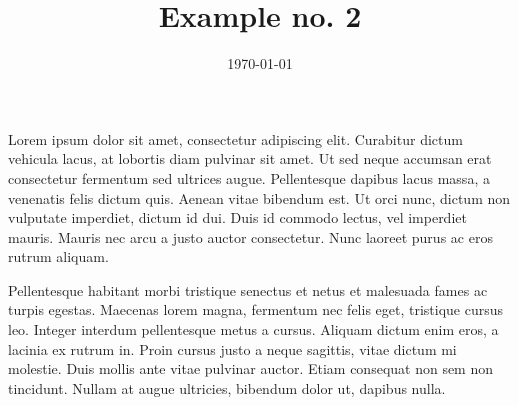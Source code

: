 
\title{Example no. 2}
\date{\today}


\maketitle
Lorem ipsum dolor sit amet, consectetur adipiscing elit. Curabitur dictum vehicula lacus, at lobortis diam pulvinar sit amet. Ut sed neque accumsan erat consectetur fermentum sed ultrices augue. Pellentesque dapibus lacus massa, a venenatis felis dictum quis. Aenean vitae bibendum est. Ut orci nunc, dictum non vulputate imperdiet, dictum id dui. Duis id commodo lectus, vel imperdiet mauris. Mauris nec arcu a justo auctor consectetur. Nunc laoreet purus ac eros rutrum aliquam. 

Pellentesque habitant morbi tristique senectus et netus et malesuada fames ac turpis egestas. Maecenas lorem magna, fermentum nec felis eget, tristique cursus leo. Integer interdum pellentesque metus a cursus. Aliquam dictum enim eros, a lacinia ex rutrum in. Proin cursus justo a neque sagittis, vitae dictum mi molestie. Duis mollis ante vitae pulvinar auctor. Etiam consequat non sem non tincidunt. Nullam at augue ultricies, bibendum dolor ut, dapibus nulla.

